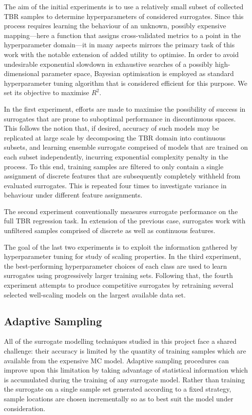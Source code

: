 The aim of the initial experiments is to use a relatively small subset of
collected TBR samples to determine hyperparameters of considered surrogates.
Since this process requires learning the behaviour of an unknown, possibly
expensive mapping---here a function that assigns cross-validated metrics to a
point in the hyperparameter domain---it in many aspects mirrors
the primary task of this work with the notable extension of added utility
to optimise. In order to avoid undesirable exponential slowdown in exhaustive
searches of a possibly high-dimensional parameter space, Bayesian
optimisation is employed as standard hyperparameter tuning algorithm that is considered
efficient for this purpose. We set its objective to maximise $R^2$.

In the first experiment, efforts are made to maximise the possibility of success
in surrogates that are prone to suboptimal performance in discontinuous spaces.
This follows the notion that, if desired, accuracy of such models may be
replicated at large scale by decomposing the TBR domain into continuous subsets,
and learning ensemble surrogate comprised of models that are trained on each
subset independently, incurring exponential complexity penalty in the process.
To this end, training samples are filtered to only contain a single assignment
of discrete features that are subsequently completely withheld from evaluated
surrogates. This is repeated four times to investigate variance in behaviour
under different feature assignments.

The second experiment conventionally measures surrogate performance on the full
TBR regression task. In extension of the previous case, surrogates work with
unfiltered samples comprised of discrete as well as continuous features.

The goal of the last two experiments is to exploit the information gathered by
hyperparameter tuning for study of scaling properties. In
the third experiment, the best-performing hyperparameter choices of each class
are used to learn surrogates using progressively larger training sets. Following
that, the fourth experiment attempts to produce competitive surrogates by
retraining several selected well-scaling models on the largest available data set.


\subsection{Adaptive Sampling}
\label{sec:adaptive}

All of the surrogate modelling techniques studied in this project face a shared challenge: their accuracy is limited by the quantity of training samples which are available from the expensive MC model. Adaptive sampling procedures can improve upon this limitation by taking advantage of statistical information which is accumulated during the training of any surrogate model. Rather than training the surrogate on a single sample set generated according to a fixed strategy, sample locations are chosen incrementally so as to best suit the model under consideration.

